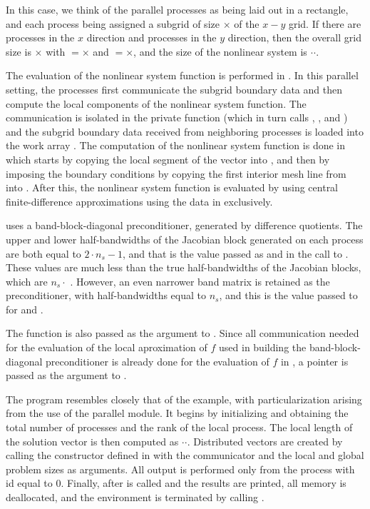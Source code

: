 In this case, we think of the parallel {\mpi} processes as
being laid out in a rectangle, and each process being assigned a
subgrid of size $\times$ of the $x-y$ grid. If
there are  processes in the $x$ direction and 
processes in the $y$ direction, then the overall grid size is
$\times$ with $=$$\times$ and
$=$$\times$, and the size of the nonlinear system is
$\cdot$$\cdot$.  

The evaluation of the nonlinear system function is performed in .
In this parallel setting, the processes first communicate the subgrid
boundary data and then compute the local components of the nonlinear system
function. The {\mpi} communication is isolated in the private function 
(which in turn calls , , and ) and the 
subgrid boundary data received from neighboring processes is loaded into the
work array . The computation of the nonlinear system function is done
in  which starts by copying the local segment of the 
vector into , and then by imposing the boundary conditions by copying the
first interior mesh line from  into . After this, the nonlinear
system function is evaluated by using central finite-difference approximations
using the data in  exclusively.

{\kinbbdpre} uses a band-block-diagonal preconditioner, generated by difference
quotients.  The upper and lower half-bandwidths of the Jacobian block generated
on each process are both equal to $2 \cdot n_s - 1$, and that is the value
passed as  and  in the call to .
These values are much less than the true half-bandwidths of the Jacobian blocks,
which are $n_s \cdot$ .  However, an even narrower band matrix
is retained as the preconditioner, with half-bandwidths equal to $n_s$, and this
is the value passed to  for  and .

The function  is also passed as the  argument to 
. Since all communication needed for the evaluation of the
local aproximation of $f$ used in building the band-block-diagonal preconditioner
is already done for the evaluation of $f$ in , a  pointer is
passed as the  argument to .

The  program resembles closely that of the  example, with
particularization arising from the use of the parallel {\mpi} {\nvecp} module.
It begins by initializing {\mpi} and obtaining the total number of processes and 
the rank of the local process. The local length of the solution vector is then 
computed as $\cdot$$\cdot$.
Distributed vectors are created by calling the constructor defined in {\nvecp}
with the {\mpi} communicator and the local and global problem sizes as arguments.
All output is performed only from the process with id equal to $0$.
Finally, after  is called and the results are printed, all memory
is deallocated, and the {\mpi} environment is terminated by calling .

